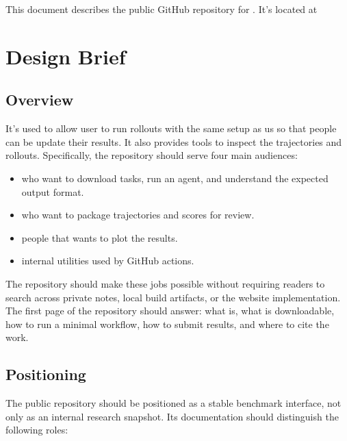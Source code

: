 \documentclass[11pt]{article}
\begin{document}
\label{docstart:public_repository}
\label{sec:public-repository}

This document describes the public GitHub repository for \name{}.
It's located at \href{https://github.com/TommasoBendinelli/tsENV.git}{}


\label{sec:public-repository-design-brief}
\section*{Design Brief}

\label{sec:public-repository-overview}
\subsection*{Overview}

It's used to allow user to run rollouts with the same setup as us so that people can be update their results.
It also provides tools to inspect the trajectories and rollouts.
Specifically, the repository should serve four main audiences:

\begin{itemize}
\item who want to download tasks, run an agent, and understand the expected output format.
\item who want to package trajectories and scores for review.
\item people that wants to plot the results.    
\item internal utilities used by GitHub actions.
\end{itemize}

The repository should make these jobs possible without requiring readers to search across private notes, local build artifacts, or the website implementation.
The first page of the repository should answer: what \name{} is, what is downloadable, how to run a minimal workflow, how to submit results, and where to cite the work.

\label{sec:public-repository-positioning}
\subsection*{Positioning}

The public repository should be positioned as a stable benchmark interface, not only as an internal research snapshot.
Its documentation should distinguish the following roles:
\end{document}
